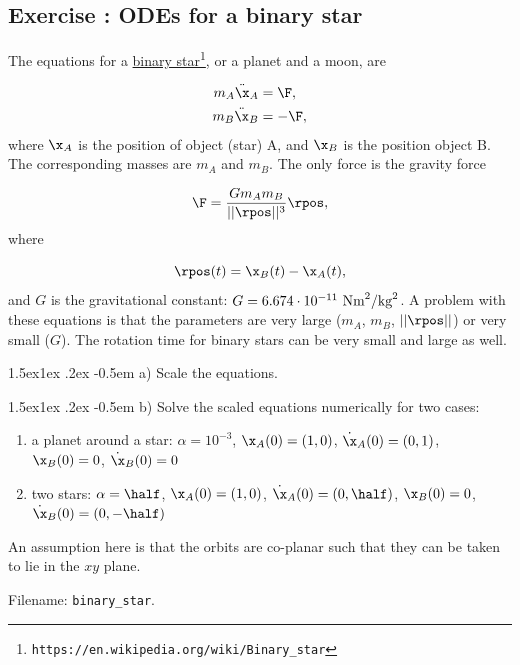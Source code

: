 \documentclass[graybox,envcountchap,sectrefs,final]{svmonodo}
\makeatletter
\newcounter{doconce:movie:counter}
\newenvironment{doconceexercise}{}{}
\newcounter{doconceexercisecounter}
\newcommand\subex{\@startsection{paragraph}{4}{\z@}%
                  {1.5ex\@plus1ex \@minus.2ex}%
                  {-0.5em}%
                  {\normalfont\normalsize\bfseries}}
\makeatother
\begin{document}
\begin{doconceexercise}

\subsection*{Exercise \thedoconceexercisecounter: ODEs for a binary star}

\label{sec:scale:exer:binary_star}

The equations for a \href{{https://en.wikipedia.org/wiki/Binary_star}}{binary star}\footnote{\texttt{https://en.wikipedia.org/wiki/Binary\_star}},
or a planet and a moon, are

\begin{align}
m_A\ddot\x_A &= \F,\\ 
m_B\ddot\x_B &= -\F,
\end{align}
where $\x_A$ is the position of object (star) A, and $\x_B$ is the position
object B. The corresponding masses are $m_A$ and $m_B$.
The only force is the gravity force

\[ \F = \frac{Gm_Am_B}{||\rpos||^3}\rpos,\]
where

\[ \rpos(t) = \x_B(t) - \x_A(t),\]
and $G$ is the gravitational constant: $G=6.674\cdot 10^{-11}\hbox{ Nm}^2/\hbox{kg}^2$. A problem with these equations is that the parameters are very large
($m_A$, $m_B$, $||\rpos||$) or very small ($G$). The rotation time
for binary stars can be very small and large as well.


\subex{a)}
Scale the equations.



\subex{b)}
Solve the scaled equations numerically for two cases:

\begin{enumerate}
\item a planet around a star:
   $\alpha = 10^{-3}$, $\x_A(0)=(1,0)$, $\dot\x_A(0)=(0,1)$,
   $\x_B(0)=0$, $\dot\x_B(0)=0$

\item two stars:
   $\alpha = \half$, $\x_A(0)=(1,0)$, $\dot\x_A(0)=(0,\half)$,
   $\x_B(0)=0$, $\dot\x_B(0)=(0,-\half)$
\end{enumerate}

\noindent
An assumption here is that the orbits are co-planar such that they can
be taken to lie in the $xy$ plane.



\noindent Filename: \Verb!binary_star!.

\end{doconceexercise}
\end{document}
